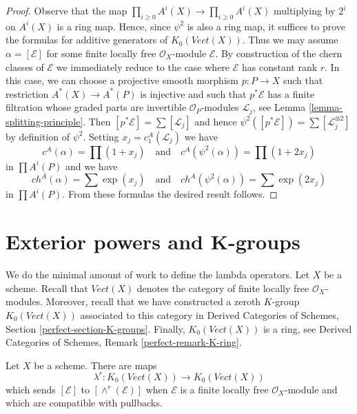 \begin{proof}
Observe that the map $\prod_{i \geq 0} A^i(X) \to \prod_{i \geq 0} A^i(X)$
multiplying by $2^i$ on $A^i(X)$ is a ring map. Hence, since $\psi^2$
is also a ring map, it suffices to prove the formulas for additive generators
of $K_0(\textit{Vect}(X))$. Thus we may assume $\alpha = [\mathcal{E}]$
for some finite locally free $\mathcal{O}_X$-module $\mathcal{E}$.
By construction of the chern classes of $\mathcal{E}$ we immediately
reduce to the case where $\mathcal{E}$ has constant rank $r$.
In this case, we can choose a projective smooth morphism $p : P \to X$
such that restriction $A^*(X) \to A^*(P)$ is injective
and such that $p^*\mathcal{E}$ has a finite filtration whose
graded parts are invertible $\mathcal{O}_P$-modules $\mathcal{L}_j$, see
Lemma \ref{lemma-splitting-principle}. Then
$[p^*\mathcal{E}] = \sum [\mathcal{L}_j]$ and hence
$\psi^2([p^*\mathcal{E}]) = \sum [\mathcal{L}_j^{\otimes 2}]$
by definition of $\psi^2$. Setting $x_j  = c^A_1(\mathcal{L}_j)$
we have
$$
c^A(\alpha) = \prod (1 + x_j)
\quad\text{and}\quad
c^A(\psi^2(\alpha)) = \prod (1 + 2 x_j)
$$
in $\prod A^i(P)$ and we have
$$
ch^A(\alpha) = \sum \exp(x_j)
\quad\text{and}\quad
ch^A(\psi^2(\alpha)) = \sum \exp(2 x_j)
$$
in $\prod A^i(P)$. From these formulas the desired result follows.
\end{proof}







\section{Exterior powers and K-groups}
\label{section-lambda-operations}

\noindent
We do the minimal amount of work to define the lambda operators.
Let $X$ be a scheme. Recall that $\textit{Vect}(X)$ denotes the
category of finite locally free $\mathcal{O}_X$-modules.
Moreover, recall that we have constructed a zeroth $K$-group
$K_0(\textit{Vect}(X))$ associated to this category in
Derived Categories of Schemes, Section \ref{perfect-section-K-groups}.
Finally, $K_0(\textit{Vect}(X))$ is a ring, see
Derived Categories of Schemes, Remark \ref{perfect-remark-K-ring}.

\begin{lemma}
\label{lemma-lambda-operations}
Let $X$ be a scheme. There are maps
$$
\lambda^r : K_0(\textit{Vect}(X)) \longrightarrow K_0(\textit{Vect}(X))
$$
which sends $[\mathcal{E}]$ to $[\wedge^r(\mathcal{E})]$
when $\mathcal{E}$ is a finite locally free $\mathcal{O}_X$-module
and which are compatible with pullbacks.
\end{lemma}

